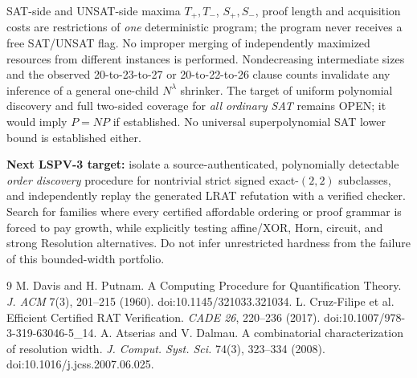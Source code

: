 \documentclass[11pt]{article}
\begin{document}
SAT-side and UNSAT-side maxima $T_+,T_-$, $S_+,S_-$, proof length and acquisition costs are restrictions of \emph{one} deterministic program; the program never receives a free SAT/UNSAT flag. No improper merging of independently maximized resources from different instances is performed. Nondecreasing intermediate sizes and the observed 20-to-23-to-27 or 20-to-22-to-26 clause counts invalidate any inference of a general one-child $N^\lambda$ shrinker. The target of uniform polynomial discovery and full two-sided coverage for \emph{all ordinary SAT} remains OPEN; it would imply $P=NP$ if established. No universal superpolynomial SAT lower bound is established either.

\noindent\textbf{Next LSPV-3 target:} isolate a source-authenticated, polynomially detectable \emph{order discovery} procedure for nontrivial strict signed exact-$(2,2)$ subclasses, and independently replay the generated LRAT refutation with a verified checker. Search for families where every certified affordable ordering or proof grammar is forced to pay growth, while explicitly testing affine/XOR, Horn, circuit, and strong Resolution alternatives. Do not infer unrestricted hardness from the failure of this bounded-width portfolio.

\begin{thebibliography}{9}
 M. Davis and H. Putnam. A Computing Procedure for Quantification Theory. \emph{J. ACM} 7(3), 201--215 (1960). doi:10.1145/321033.321034.
 L. Cruz-Filipe et al. Efficient Certified RAT Verification. \emph{CADE 26}, 220--236 (2017). doi:10.1007/978-3-319-63046-5\_14.
 A. Atserias and V. Dalmau. A combinatorial characterization of resolution width. \emph{J. Comput. Syst. Sci.} 74(3), 323--334 (2008). doi:10.1016/j.jcss.2007.06.025.
\end{thebibliography}
\end{document}
